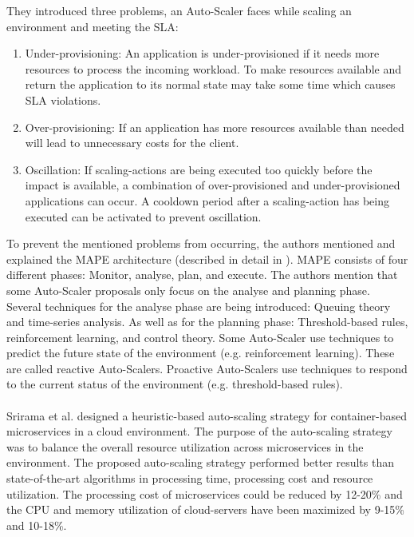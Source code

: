 They introduced three problems, an Auto-Scaler faces while scaling an environment and meeting the SLA:
\begin{enumerate}
\item Under-provisioning:
An application is under-provisioned if it needs more resources to process the incoming workload.
To make resources available and return the application to its normal state may take some time which causes SLA violations.
\item Over-provisioning:
If an application has more resources available than needed will lead to unnecessary costs for the client.
\item Oscillation:
If scaling-actions are being executed too quickly before the impact is available, a combination of over-provisioned and under-provisioned applications can occur.
A cooldown period after a scaling-action has being executed can be activated to prevent oscillation.
\end{enumerate}
To prevent the mentioned problems from occurring, the authors mentioned and explained the MAPE architecture (described in detail in ).
MAPE consists of four different phases: Monitor, analyse, plan, and execute.
The authors mention that some Auto-Scaler proposals only focus on the analyse and planning phase. 
Several techniques for the analyse phase are being introduced: Queuing theory and time-series analysis.
As well as for the planning phase: Threshold-based rules, reinforcement learning, and control theory.
Some Auto-Scaler use techniques to predict the future state of the environment (e.g. reinforcement learning). These are called reactive Auto-Scalers.
Proactive Auto-Scalers use techniques to respond to the current status of the environment (e.g. threshold-based rules).


\paragraph{}
Srirama et al. \citep{Srirama2020AppDeplyCont} designed a heuristic-based auto-scaling strategy for container-based microservices in a cloud environment. The purpose of the auto-scaling strategy was to balance the overall resource utilization across microservices in the environment.
The proposed auto-scaling strategy performed better results than state-of-the-art algorithms in processing time, processing cost and resource utilization. The processing cost of microservices could be reduced by 12-20\% and the CPU and memory utilization of cloud-servers have been maximized by 9-15\% and 10-18\%.


